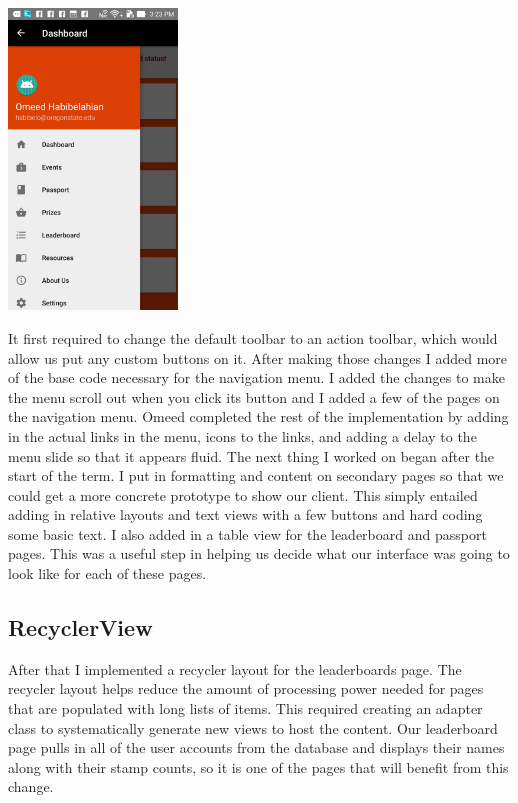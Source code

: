 \documentclass[onecolumn, draftclsnofoot,10pt, compsoc]{IEEEtran}
\begin{document}
		\includegraphics[height=8cm]{navigationmenu}

		It first required to change the default toolbar to an action toolbar, which would allow us put any custom buttons on it. After making those changes I added more of the base code necessary for the navigation menu. I added the changes to make the menu scroll out when you click its button and I added a few of the pages on the navigation menu. Omeed completed the rest of the implementation by adding in the actual links in the menu, icons to the links, and adding a delay to the menu slide so that it appears fluid. The next thing I worked on began after the start of the term. I put in formatting and content on secondary pages so that we could get a more concrete prototype to show our client. This simply entailed adding in relative layouts and text views with a few buttons and hard coding some basic text. I also added in a table view for the leaderboard and passport pages. This was a useful step in helping us decide what our interface was going to look like for each of these pages.

	\subsection{RecyclerView}
		After that I implemented a recycler layout for the leaderboards page. The recycler layout helps reduce the amount of processing power needed for pages that are populated with long lists of items. This required creating an adapter class to systematically generate new views to host the content. Our leaderboard page pulls in all of the user accounts from the database and displays their names along with their stamp counts, so it is one of the pages that will benefit from this change. \\ \\
\end{document}
